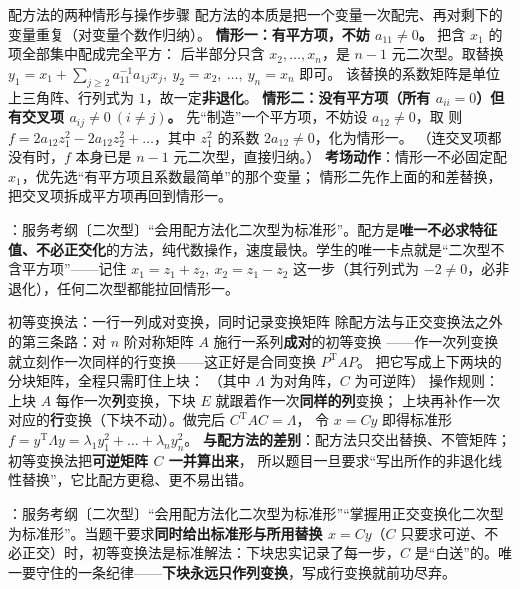 \begin{fdeep}{配方法的两种情形与操作步骤}
配方法的本质是把一个变量一次配完、再对剩下的变量重复（对变量个数作归纳）。
\textbf{情形一：有平方项，不妨 $a_{11}\ne0$。} 把含 $x_1$ 的项全部集中配成完全平方：
后半部分只含 $x_2,\dots,x_n$，是 $n-1$ 元二次型。取替换
$y_1=x_1+\sum_{j\ge2}a_{11}^{-1}a_{1j}x_j,\ y_2=x_2,\ \dots,\ y_n=x_n$ 即可。
该替换的系数矩阵是单位上三角阵、行列式为 $1$，故一定\textbf{非退化}。
\textbf{情形二：没有平方项（所有 $a_{ii}=0$）但有交叉项 $a_{ij}\ne0\ (i\ne j)$。}
先“制造”一个平方项，不妨设 $a_{12}\ne0$，取
则 $f=2a_{12}z_1^{2}-2a_{12}z_2^{2}+\dots$，其中 $z_1^{2}$ 的系数 $2a_{12}\ne0$，化为情形一。
（连交叉项都没有时，$f$ 本身已是 $n-1$ 元二次型，直接归纳。）
\textbf{考场动作}：情形一不必固定配 $x_1$，优先选“有平方项且系数最简单”的那个变量；
情形二先作上面的和差替换，把交叉项拆成平方项再回到情形一。

\fbref{}：服务考纲〔二次型〕“会用配方法化二次型为标准形”。配方是\textbf{唯一不必求特征值、不必正交化}的方法，纯代数操作，速度最快。学生的唯一卡点就是“二次型不含平方项”——记住 $x_1=z_1+z_2,\ x_2=z_1-z_2$ 这一步（其行列式为 $-2\ne0$，必非退化），任何二次型都能拉回情形一。
\end{fdeep}

\begin{fdeep}{初等变换法：一行一列成对变换，同时记录变换矩阵}
除配方法与正交变换法之外的第三条路：对 $n$ 阶对称矩阵 $A$ 施行一系列\textbf{成对}的初等变换
——作一次列变换就立刻作一次同样的行变换——这正好是合同变换 $P^{\mathrm T}AP$。
把它写成上下两块的分块矩阵，全程只需盯住上块：
（其中 $\Lambda$ 为对角阵，$C$ 为可逆阵）
操作规则：上块 $A$ 每作一次\textbf{列}变换，下块 $E$ 就跟着作一次\textbf{同样的列}变换；
上块再补作一次对应的\textbf{行}变换（下块不动）。做完后 $C^{\mathrm T}AC=\Lambda$，
令 $x=Cy$ 即得标准形 $f=y^{\mathrm T}\Lambda y=\lambda_1y_1^{2}+\dots+\lambda_ny_n^{2}$。
\textbf{与配方法的差别}：配方法只交出替换、不管矩阵；初等变换法把\textbf{可逆矩阵 $C$ 一并算出来}，
所以题目一旦要求“写出所作的非退化线性替换”，它比配方更稳、更不易出错。

\fbref{}：服务考纲〔二次型〕“会用配方法化二次型为标准形”“掌握用正交变换化二次型为标准形”。当题干要求\textbf{同时给出标准形与所用替换 $x=Cy$}（$C$ 只要求可逆、不必正交）时，初等变换法是标准解法：下块忠实记录了每一步，$C$ 是“白送”的。唯一要守住的一条纪律——\textbf{下块永远只作列变换}，写成行变换就前功尽弃。
\end{fdeep}

